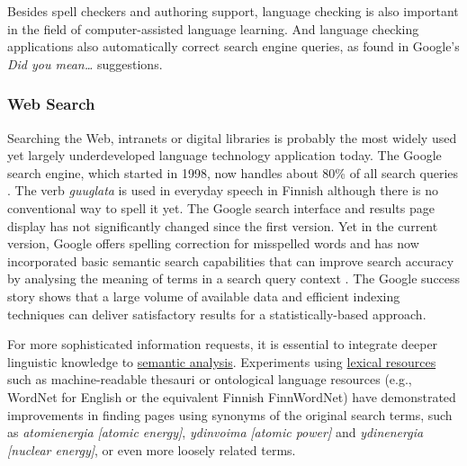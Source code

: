 \documentclass[]{../../metanetpaper}
\begin{document}
\begin{multicols}{2}
Besides spell checkers and authoring support, language checking is
also important in the field of computer-assisted language
learning. And language checking applications also automatically
correct search engine queries, as found in Google's \textit{Did you
mean\dots} suggestions.

\subsubsection{Web Search}


Searching the Web, intranets or digital libraries is probably the
most widely used yet largely underdeveloped language technology
application today. The Google search engine, which started in 1998,
now handles about 80\% of all search queries \cite{Spiegel}. The verb
\textit{\foreignlanguage{finnish}{\textit{guuglata}}} is used in everyday
speech in Finnish although there is no conventional way to spell it
yet. The Google search interface and results page display has not
significantly changed since the first version. Yet in the current
version, Google offers spelling correction for misspelled words and
has now incorporated basic semantic search capabilities that can
improve search accuracy by analysing the meaning of terms in a search
query context \cite{Google-rolls}. The Google success story shows that
a large volume of available data and efficient indexing techniques can
deliver satisfactory results for a statistically-based approach.

For more sophisticated information requests, it is essential to
integrate deeper linguistic knowledge to \underline{semantic
analysis}. Experiments using \underline{lexical resources} such
as machine-readable thesauri or ontological language resources (e.g.,
WordNet for English or the equivalent Finnish FinnWordNet) have
demonstrated improvements in finding pages using synonyms of the
original search terms, such as
{\foreignlanguage{finnish}{\textit{atomienergia}}} \textit{[atomic energy]},
{\foreignlanguage{finnish}{\textit{ydinvoima}}} \textit{[atomic power]} and
{\foreignlanguage{finnish}{\textit{ydinenergia}}} \textit{[nuclear energy]},
or even more loosely related terms.



\end{multicols}
\end{document}
